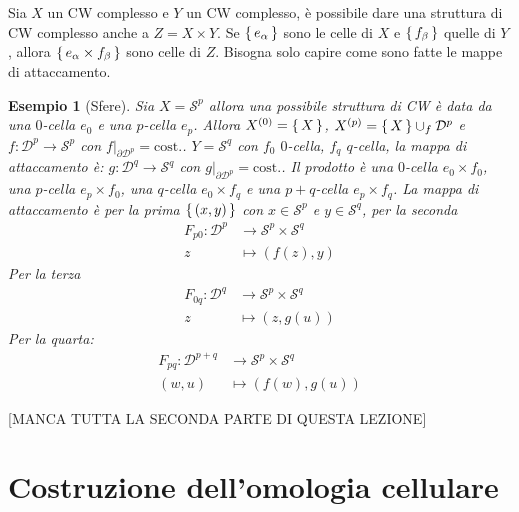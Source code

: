 \documentclass[10pt, twoside=false, x11names]{scrbook}
\newtheorem{example}[theorem]{Esempio}
\newcommand{\Sph}[1][]{\mathcal{S}^#1}
\newcommand{\Disk}[1][]{\mathcal{D}^#1}
\begin{document}
Sia $ X $ un CW complesso e $ Y $ un CW complesso, è
possibile dare una struttura di CW complesso anche a $ Z = X \times Y  $.
Se $ \set{e_\alpha} $ sono le celle di $ X $ e $ \set{f_\beta} $
quelle di $ Y $, allora $ \set{e_\alpha \times f_\beta} $ sono
celle di $ Z $. Bisogna solo capire come sono fatte le
mappe di attaccamento.

\begin{example}[Sfere]
  Sia $ X = \Sph{p} $ allora una possibile struttura di CW
  è data da una $ 0 $-cella $ e_0 $ e una $ p $-cella $ e_p $.
  Allora $ X^{(0)} = \set{X} $, $ X^{(p)} = \set{X} \cup_f \Disk{p} $
  e $ f \colon \Disk{p} \to \Sph{p} $ con $ f \big \vert_{\partial \Disk{p}} = \mathrm{cost.} $.
  $ Y = \Sph{q} $ con $ f_0 $ $ 0 $-cella, $ f_q $ $ q $-cella,
  la mappa di attaccamento è: $ g \colon \Disk{q} \to \Sph{q} $ con $ g \big \vert_{\partial \Disk{p}} = \mathrm{cost.} $.
  Il prodotto è una $ 0 $-cella $ e_0 \times f_0 $, una $ p $-cella
  $ e_p \times f_0 $, una $ q $-cella $ e_0 \times f_q $ e una $ p + q $-cella
  $ e_p \times f_q $. La mappa di attaccamento è per la prima
  $ \set{(x,y)} $ con $ x \in \Sph{p} $ e $ y \in \Sph{q} $,
  per la seconda
  \begin{align*}
    F_{p0} \colon \Disk{p} & \to \Sph{p} \times \Sph{q} \\
    z & \mapsto (f(z), y)
  \end{align*}
  Per la terza
  \begin{align*}
    F_{0q} \colon \Disk{q} & \to \Sph{p} \times \Sph{q} \\
    z & \mapsto (z, g(u))
  \end{align*}
  Per la quarta:
  \begin{align*}
    F_{pq} \colon \Disk{p+q} & \to \Sph{p} \times \Sph{q} \\
    (w,u) & \mapsto (f(w), g(u))
  \end{align*}
\end{example}



[MANCA TUTTA LA SECONDA PARTE DI QUESTA LEZIONE]



\section{Costruzione dell'omologia cellulare}
\end{document}

